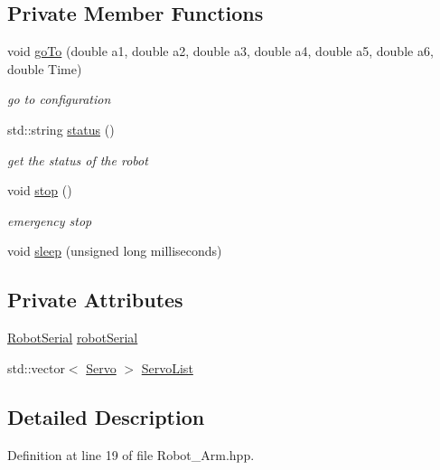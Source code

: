 \subsection*{Private Member Functions}
\begin{DoxyCompactItemize}
\item 
void \hyperlink{class_robot_arm_a71fb5e56bdc1ec60d8f769226e80dc28}{go\+To} (double a1, double a2, double a3, double a4, double a5, double a6, double Time)
\begin{DoxyCompactList}\small\item\em go to configuration \end{DoxyCompactList}\item 
std\+::string \hyperlink{class_robot_arm_a19ee5ffdc095ee2771353372fce03252}{status} ()
\begin{DoxyCompactList}\small\item\em get the status of the robot \end{DoxyCompactList}\item 
void \hyperlink{class_robot_arm_abd7be4339ad5fe6c65b07b4930f52e69}{stop} ()
\begin{DoxyCompactList}\small\item\em emergency stop \end{DoxyCompactList}\item 
void \hyperlink{class_robot_arm_afa693a670ce5c4fc705fd0b9b75d516b}{sleep} (unsigned long milliseconds)
\end{DoxyCompactItemize}
\subsection*{Private Attributes}
\begin{DoxyCompactItemize}
\item 
\hyperlink{class_robot_serial}{Robot\+Serial} \hyperlink{class_robot_arm_aa1be826408c3c876e2227095bba1cd17}{robot\+Serial}
\item 
std\+::vector$<$ \hyperlink{struct_servo}{Servo} $>$ \hyperlink{class_robot_arm_a2fd2d1c096f1b147b7882d7bfd202eaf}{Servo\+List}
\end{DoxyCompactItemize}


\subsection{Detailed Description}


Definition at line 19 of file Robot\+\_\+\+Arm.\+hpp.



